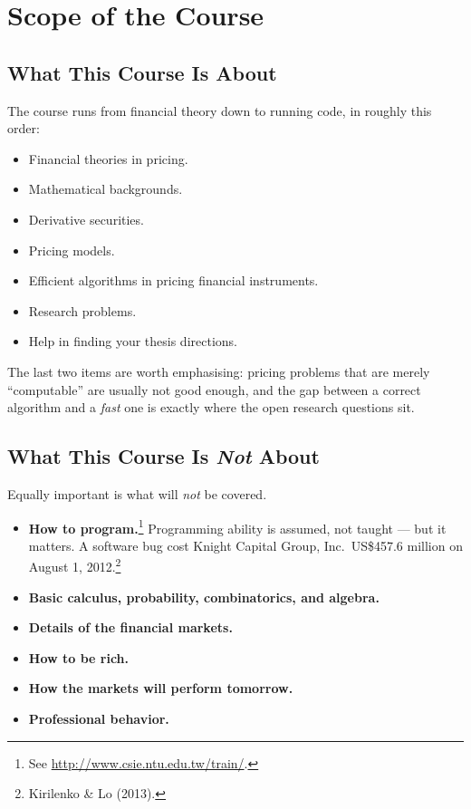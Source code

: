\section{Scope of the Course}


\subsection{What This Course Is About}

The course runs from financial theory down to running code, in roughly this order:

\begin{itemize}[nosep]
	\item Financial theories in pricing.
	\item Mathematical backgrounds.
	\item Derivative securities.
	\item Pricing models.
	\item Efficient algorithms in pricing financial instruments.
	\item Research problems.
	\item Help in finding your thesis directions.
\end{itemize}

\suppstart
The last two items are worth emphasising: pricing problems that are merely ``computable'' are usually not good enough, and the gap between a correct algorithm and a \emph{fast} one is exactly where the open research questions sit.
\suppend

\subsection{What This Course Is \texorpdfstring{\emph{Not}}{Not} About}

Equally important is what will \emph{not} be covered.

\begin{itemize}[itemsep=0.35em]
	\item \textbf{How to program.}\footnote{See \url{http://www.csie.ntu.edu.tw/train/}.} Programming ability is assumed, not taught --- but it matters.
	      A software bug cost Knight Capital Group, Inc.\ US\$457.6 million on August 1, 2012.\footnote{Kirilenko \& Lo (2013).}
	\item \textbf{Basic calculus, probability, combinatorics, and algebra.}
	\item \textbf{Details of the financial markets.}
	\item \textbf{How to be rich.}
	\item \textbf{How the markets will perform tomorrow.}
	\item \textbf{Professional behavior.}
\end{itemize}

